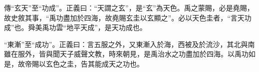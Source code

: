 {\noindent\zhuan{}\fzbyks 傳“玄天”至“功成”。正義曰：“天謂之玄”，是“玄”為天色。禹之蒙賜，必是堯賜，故史敘其事，“禹功盡加於四海，故堯賜玄圭以玄顯之”。必以天色圭者，“言天功成”也。舜美禹功雲“地平天成”，是天功成也。 \par}

{\noindent\shu{}\fzkt “東漸”至“成功”。正義曰：言五服之外，又東漸入於海，西被及於流沙，其北與南雖在服外，皆與聞天子威聲文教，時來朝見，是禹治水之功盡加於四海。以禹功如是，故帝賜以玄色之圭，告其能成天之功也。 \par}

